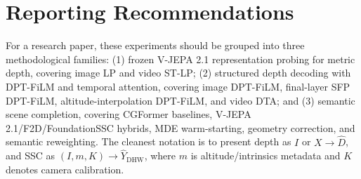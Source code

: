 \documentclass[10pt]{article}
\newcommand{\stlp}{ST-LP}
\newcommand{\dta}{DTA}
\begin{document}
\section{Reporting Recommendations}
For a research paper, these experiments should be grouped into three methodological families: (1) frozen V-JEPA 2.1 representation probing for metric depth, covering image LP and video \stlp; (2) structured depth decoding with DPT-FiLM and temporal attention, covering image DPT-FiLM, final-layer SFP DPT-FiLM, altitude-interpolation DPT-FiLM, and video \dta; and (3) semantic scene completion, covering CGFormer baselines, V-JEPA 2.1/F2D/FoundationSSC hybrids, MDE warm-starting, geometry correction, and semantic reweighting.  The cleanest notation is to present depth as \(I\) or \(X\rightarrow\hat{D}\), and SSC as \((I,m,K)\rightarrow\hat{Y}_{\mathrm{DHW}}\), where \(m\) is altitude/intrinsics metadata and \(K\) denotes camera calibration.
\end{document}
